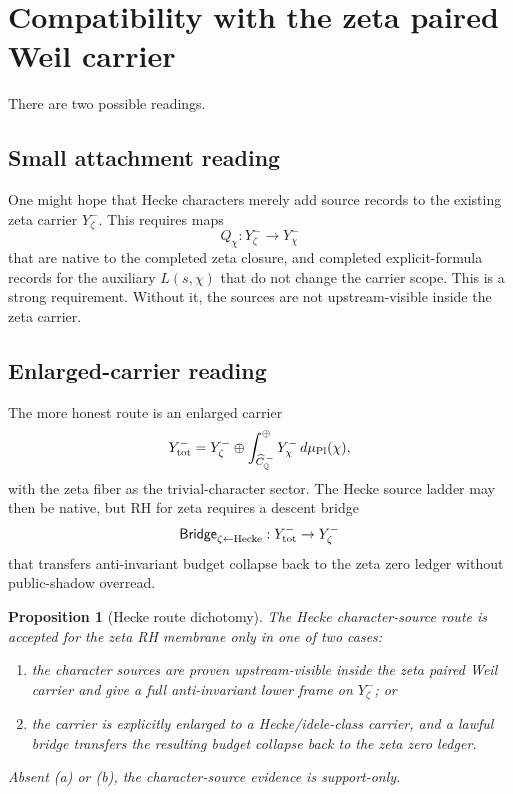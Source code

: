 \documentclass[11pt]{article}
\newtheorem{proposition}{Proposition}
\newcommand{\Hecke}{\mathrm{Hecke}}
\newcommand{\Zeta}{\zeta}
\begin{document}
\section{Compatibility with the zeta paired Weil carrier}
There are two possible readings.

\subsection{Small attachment reading}
One might hope that Hecke characters merely add source records to the existing zeta carrier \(Y^-_{\Zeta}\).  This requires maps
\begin{equation}
  Q_\chi:Y^-_{\Zeta}\to Y^-_\chi
\end{equation}
that are native to the completed zeta closure, and completed explicit-formula records for the auxiliary \(L(s,\chi)\) that do not change the carrier scope.  This is a strong requirement.  Without it, the sources are not upstream-visible inside the zeta carrier.

\subsection{Enlarged-carrier reading}
The more honest route is an enlarged carrier
\begin{equation}
  Y^-_{\rm tot}=Y^-_{\Zeta}\oplus\int_{\widehat C_{\mathbb Q}^{\,-}}^{\oplus}Y^-_\chi\,d\mu_{\rm Pl}(\chi),
\end{equation}
with the zeta fiber as the trivial-character sector.  The Hecke source ladder may then be native, but RH for zeta requires a descent bridge
\begin{equation}
  \mathsf{Bridge}_{\Zeta\leftarrow\Hecke}:Y^-_{\rm tot}\to Y^-_{\Zeta}
\end{equation}
that transfers anti-invariant budget collapse back to the zeta zero ledger without public-shadow overread.

\begin{proposition}[Hecke route dichotomy]
The Hecke character-source route is accepted for the zeta RH membrane only in one of two cases:
\begin{enumerate}[label=(\alph*)]
\item the character sources are proven upstream-visible inside the zeta paired Weil carrier and give a full anti-invariant lower frame on \(Y^-_{\Zeta}\); or
\item the carrier is explicitly enlarged to a Hecke/idele-class carrier, and a lawful bridge transfers the resulting budget collapse back to the zeta zero ledger.
\end{enumerate}
Absent (a) or (b), the character-source evidence is support-only.
\end{proposition}
\end{document}
